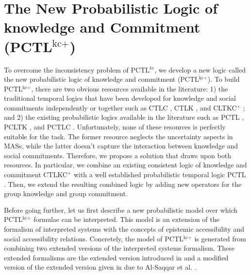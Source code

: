 \section{The New Probabilistic Logic of knowledge and Commitment (PCTL$^{\textrm{kc+}}$)} \label{sec:logic}

To overcome the inconsistency problem of PCTL$^{kc}$, we develop a new logic called the new probabilistic logic of knowledge and commitment (PCTL$^{\textrm{kc+}}$). To build PCTL$^{\textrm{kc+}}$, there are two obvious resources available in the literature: 1) the traditional temporal logics that have been developed for knowledge and social commitments independently or together such as CTLC \cite{Bentahar2012}, CTLK \cite{Lomuscio2007}, and CLTKC$^+$ \cite{Al-Saqqar2014a}; and 2) the existing probabilistic logics available in the literature such as PCTL \cite{Hansson1994}, PCLTK \cite{Wan2013}, and PCTLC \cite{Sultan2014a}. Unfortunately, none of these resources is perfectly suitable for the task. The former resource neglects the uncertainty aspects in MASs, while the
latter doesn't capture the interaction between knowledge and
social commitments. Therefore, we propose a solution that draws
upon both resources. In particular, we combine an existing
consistent logic of knowledge and commitment CTLKC$^+$
\cite{Al-Saqqar2014a} with a well established probabilistic
temporal logic PCTL \cite{Hansson1994}. Then, we extend the
resulting combined logic by adding new operators for the group knowledge
and group commitment.

Before going further, let us first describe a new probabilistic model over which PCTL$^{\textrm{kc+}}$ formulae can be interpreted. This model is an extension of the formalism of interpreted systems
\cite{Fagin1995} with the concepts of epistemic accessibility and
social accessibility relations. Concretely, the model of PCTL$^{\textrm{kc+}}$ is generated from combining two extended versions of the interpreted systems formalism. These extended formalisms are the extended version introduced in \cite{Halpern2003,Wan2013} and a modified version of the extended version given in \cite{Bentahar2012,El-Menshawy2013a} due to Al-Saqqar et al. \cite{Al-Saqqar2014a}.


